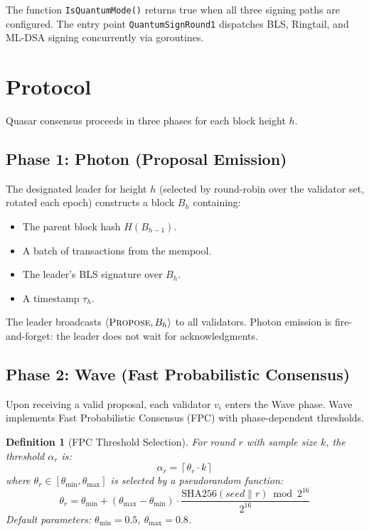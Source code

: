 \documentclass[11pt,a4paper]{article}
\newtheorem{definition}{Definition}[section]
\begin{document}
The function \texttt{IsQuantumMode()} returns true when all three signing paths
are configured. The entry point \texttt{QuantumSignRound1} dispatches BLS,
Ringtail, and ML-DSA signing concurrently via goroutines.


\section{Protocol}
\label{sec:protocol}

Quasar consensus proceeds in three phases for each block height $h$.

\subsection{Phase 1: Photon (Proposal Emission)}

The designated leader for height $h$ (selected by round-robin over the
validator set, rotated each epoch) constructs a block $B_h$ containing:
\begin{itemize}[leftmargin=2em]
\item The parent block hash $H(B_{h-1})$.
\item A batch of transactions from the mempool.
\item The leader's BLS signature over $B_h$.
\item A timestamp $\tau_h$.
\end{itemize}
The leader broadcasts $\langle \textsc{Propose}, B_h \rangle$ to all
validators. Photon emission is fire-and-forget: the leader does not wait
for acknowledgments.

\subsection{Phase 2: Wave (Fast Probabilistic Consensus)}

Upon receiving a valid proposal, each validator $v_i$ enters the Wave phase.
Wave implements Fast Probabilistic Consensus (FPC) with phase-dependent
thresholds.

\begin{definition}[FPC Threshold Selection]
\label{def:fpc}
For round $r$ with sample size $k$, the threshold $\alpha_r$ is:
\[
\alpha_r = \left\lceil \theta_r \cdot k \right\rceil
\]
where $\theta_r \in [\theta_{\min}, \theta_{\max}]$ is selected by a
pseudorandom function:
\[
\theta_r = \theta_{\min} + (\theta_{\max} - \theta_{\min}) \cdot
\frac{\mathrm{SHA256}(\mathit{seed} \mathbin\| r) \bmod 2^{16}}{2^{16}}
\]
Default parameters: $\theta_{\min} = 0.5$, $\theta_{\max} = 0.8$.
\end{definition}
\end{document}
